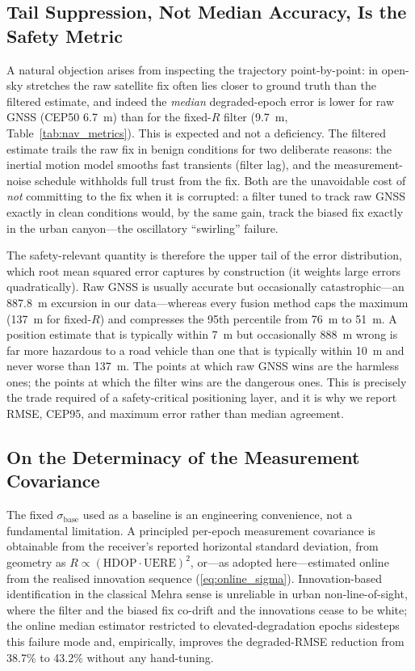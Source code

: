 \documentclass[journal]{IEEEtran}
\newcommand{\sigbase}{\sigma_{\mathrm{base}}}
\begin{document}
\subsection{Tail Suppression, Not Median Accuracy, Is the Safety Metric}

A natural objection arises from inspecting the trajectory point-by-point: in
open-sky stretches the raw satellite fix often lies closer to ground truth than
the filtered estimate, and indeed the \emph{median} degraded-epoch error is
lower for raw GNSS (CEP50 6.7~m) than for the fixed-$R$ filter (9.7~m,
Table~\ref{tab:nav_metrics}).  This is expected and not a deficiency.  The
filtered estimate trails the raw fix in benign conditions for two deliberate
reasons: the inertial motion model smooths fast transients (filter lag), and
the measurement-noise schedule withholds full trust from the fix.  Both are the
unavoidable cost of \emph{not} committing to the fix when it is corrupted: a
filter tuned to track raw GNSS exactly in clean conditions would, by the same
gain, track the biased fix exactly in the urban canyon---the oscillatory
``swirling'' failure.

The safety-relevant quantity is therefore the upper tail of the error
distribution, which root mean squared error captures by construction (it
weights large errors quadratically).  Raw GNSS is usually accurate but
occasionally catastrophic---an 887.8~m excursion in our data---whereas every
fusion method caps the maximum (137~m for fixed-$R$) and compresses the 95th
percentile from 76~m to 51~m.  A position estimate that is typically within
7~m but occasionally 888~m wrong is far more hazardous to a road vehicle than
one that is typically within 10~m and never worse than 137~m.  The points at
which raw GNSS wins are the harmless ones; the points at which the filter wins
are the dangerous ones.  This is precisely the trade required of a
safety-critical positioning layer, and it is why we report RMSE, CEP95, and
maximum error rather than median agreement.

\subsection{On the Determinacy of the Measurement Covariance}

The fixed $\sigbase$ used as a baseline is an engineering convenience, not a
fundamental limitation.  A principled per-epoch measurement covariance is
obtainable from the receiver's reported horizontal standard deviation, from
geometry as $R \propto (\mathrm{HDOP}\cdot\mathrm{UERE})^2$, or---as adopted
here---estimated online from the realised innovation sequence
(\eqref{eq:online_sigma}).  Innovation-based identification in the classical
Mehra sense is unreliable in urban non-line-of-sight, where the filter and the
biased fix co-drift and the innovations cease to be white; the online median
estimator restricted to elevated-degradation epochs sidesteps this failure
mode and, empirically, improves the degraded-RMSE reduction from 38.7\% to
43.2\% without any hand-tuning.
\end{document}
